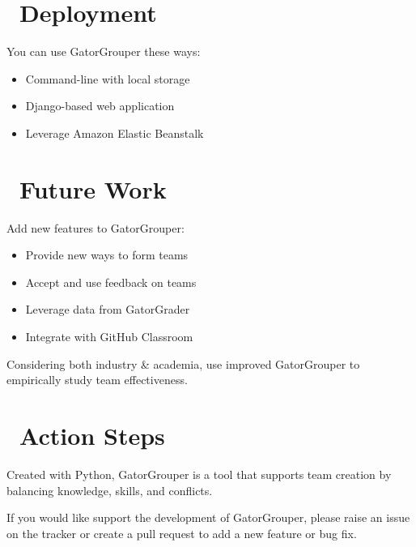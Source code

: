 \documentclass[a0paper,fleqn]{betterposter}
\begin{document}
{\begin{itemize}[leftmargin=*]
  \end{itemize}

  \section{\faCloudUpload~Deployment}
  You can use GatorGrouper these ways:\\
  \vspace*{-.5in}
  \begin{itemize}[leftmargin=*]

    \item{Command-line with local storage}
    \item{Django-based web application}
    \item{Leverage Amazon Elastic Beanstalk}

  \end{itemize}

  \section{\faDashboard~Future Work}
  Add new features to GatorGrouper: \\
  \vspace*{-.5in}

  \begin{itemize}[leftmargin=*]

    \item{Provide new ways to form teams}
    \item{Accept and use feedback on teams}
    \item{Leverage data from GatorGrader}
    \item{Integrate with GitHub Classroom}

  \end{itemize}

  \vspace{.5em}
  Considering both industry \& academia, use improved GatorGrouper to
  empirically study team effectiveness.

  \section{\faRocket~Action Steps}
  Created with Python, GatorGrouper is a tool that supports team creation by
  balancing knowledge, skills, and conflicts.

  \vspace*{.25in}
  If you would like support the development of GatorGrouper, please raise an
  issue on the tracker or create a pull request to add a new feature or bug fix.

}
\end{document}
